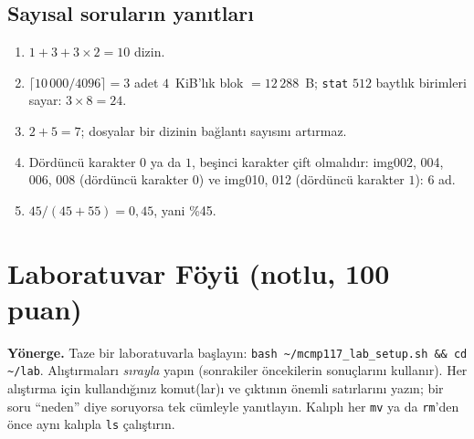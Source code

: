 \documentclass[11pt,a4paper]{article}
\newcommand{\cmd}[1]{\texttt{#1}}
\begin{document}
\subsection*{Sayısal soruların yanıtları}
\begin{enumerate}[leftmargin=1.6em,start=7]
  \item $1 + 3 + 3 \times 2 = 10$ dizin.
  \item $\lceil 10\,000 / 4096 \rceil = 3$ adet $4$~KiB'lık blok $= 12\,288$~B; \cmd{stat} $512$ baytlık birimleri sayar: $3 \times 8 = 24$.
  \item $2 + 5 = 7$; dosyalar bir dizinin bağlantı sayısını artırmaz.
  \item Dördüncü karakter $0$ ya da $1$, beşinci karakter çift olmalıdır: img002, 004, 006, 008 (dördüncü karakter $0$) ve img010, 012 (dördüncü karakter $1$): $6$ ad.
  \item $45/(45+55) = 0{,}45$, yani \%45.
\end{enumerate}

\section{Laboratuvar Föyü (notlu, 100 puan)}
\label{sec:lab}

\textbf{Yönerge.} Taze bir laboratuvarla başlayın: \cmd{bash \textasciitilde/mcmp117\_lab\_setup.sh \&\& cd \textasciitilde/lab}. Alıştırmaları \emph{sırayla} yapın (sonrakiler öncekilerin sonuçlarını kullanır). Her alıştırma için kullandığınız komut(lar)ı ve çıktının önemli satırlarını yazın; bir soru ``neden'' diye soruyorsa tek cümleyle yanıtlayın. Kalıplı her \cmd{mv} ya da \cmd{rm}'den önce aynı kalıpla \cmd{ls} çalıştırın.
\end{document}
